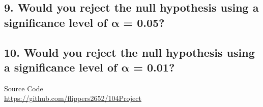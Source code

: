 \documentclass[12pt,oneside]{book}
\begin{document}
\begin{minipage}{.96\textwidth}
\subsection*{9. Would you reject the null hypothesis using a significance level of $\boldsymbol{\alpha}$ = 0.05?}
\ifdim \pvalue pt>0.05pt {
I would not have sufficient evidence to reject the null hypothesis at $\alpha = 0.05$ as $p=\pvalue>0.05$. Also $0 \in \intervalA$. So $\mu_P=0$.
}\else {
I would have sufficient evidence to reject the null hypothesis at $\alpha = 0.05$ as $p=\pvalue<0.05$. Also $0 \not\in \intervalA$. So $\mu_P\neq0$.
} \fi
\subsection*{10. Would you reject the null hypothesis using a significance level of $\boldsymbol{\alpha}$ = 0.01?}
\ifdim \pvalue pt>0.01pt {
I would not have sufficient evidence to reject the null hypothesis at $\alpha = 0.01$ as $p=\pvalue>0.01$. Also $0 \in \intervalB$. So $\mu_P=0$.
} \else {
I would have sufficient evidence to reject the null hypothesis at $\alpha = 0.01$ as $p=\pvalue<0.01$. Also $0 \not\in \intervalB$. So $\mu_P\neq0$.
} \fi
\end{minipage}%

\begin{tcolorbox}
{\large Source Code}\\
\url{https://github.com/flippers2652/104Project}
\end{tcolorbox}
\end{document}
